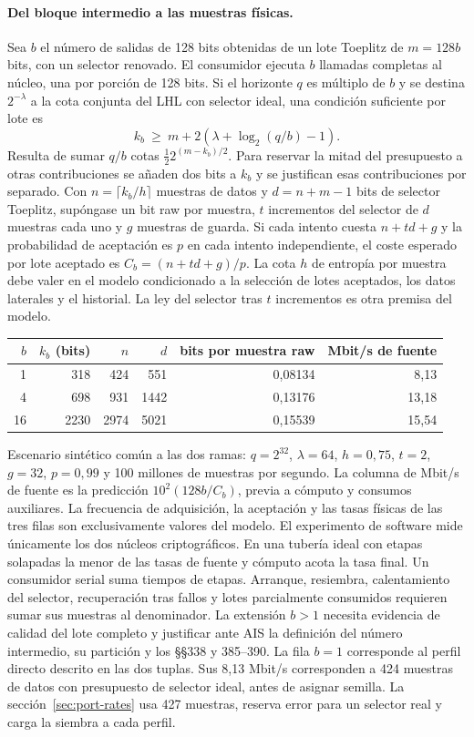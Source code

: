 \paragraph{Del bloque intermedio a las muestras físicas.} Sea $b$ el número de salidas de
128 bits obtenidas de un lote Toeplitz de $m=128b$ bits, con un selector renovado. El consumidor
ejecuta $b$ llamadas completas al núcleo, una por porción de 128 bits. Si el horizonte $q$ es
múltiplo de $b$ y se destina $2^{-\lambda}$ a la cota conjunta del LHL con selector ideal,
una condición suficiente por lote es
\[
 k_b\ \ge\ m+2\left(\lambda+\log_2(q/b)-1\right).
\]
Resulta de sumar $q/b$ cotas $\tfrac12 2^{(m-k_b)/2}$. Para reservar la mitad del presupuesto
a otras contribuciones se añaden dos bits a $k_b$ y se justifican esas contribuciones por separado.
Con $n=\lceil k_b/h\rceil$ muestras de datos y $d=n+m-1$ bits de selector Toeplitz, supóngase un
bit raw por muestra, $t$ incrementos del selector de $d$ muestras cada uno y $g$ muestras de
guarda. Si cada intento cuesta $n+td+g$ y la probabilidad de aceptación es $p$ en cada intento
independiente, el coste esperado por lote aceptado es $C_b=(n+td+g)/p$. La cota $h$ de entropía
por muestra debe valer en el modelo condicionado a la selección de lotes aceptados, los datos
laterales y el historial. La ley del selector tras $t$ incrementos es otra premisa del modelo.

\begin{center}\small
\begin{tabular}{@{}rrrrrr@{}}\toprule
$b$ & $k_b$ (bits) & $n$ & $d$ & bits por muestra raw & Mbit/s de fuente\\\midrule
1 &318&424&551&0,08134&8,13\\
4 &698&931&1442&0,13176&13,18\\
16&2230&2974&5021&0,15539&15,54\\\bottomrule
\end{tabular}\end{center}
Escenario sintético común a las dos ramas: $q=2^{32}$, $\lambda=64$, $h=0{,}75$, $t=2$,
$g=32$, $p=0{,}99$ y 100 millones de muestras por segundo. La columna de Mbit/s de fuente es la predicción
$10^2(128b/C_b)$, previa a cómputo y consumos auxiliares. La frecuencia de adquisición, la
aceptación y las tasas físicas de las tres filas son exclusivamente valores del modelo.
El experimento de software mide únicamente los dos núcleos criptográficos. En una tubería ideal con etapas
solapadas la menor de las tasas de fuente y cómputo acota la tasa final. Un consumidor serial
suma tiempos de etapas. Arranque, resiembra, calentamiento del selector, recuperación tras
fallos y lotes parcialmente consumidos requieren sumar sus muestras al denominador.
La extensión $b>1$ necesita evidencia de calidad del lote completo y justificar ante AIS la
definición del número intermedio, su partición y los §§338 y 385--390. La fila $b=1$ corresponde
al perfil directo descrito en las dos tuplas. Sus 8,13 Mbit/s corresponden a
424 muestras de datos con presupuesto de selector ideal, antes de asignar semilla.
La sección~\ref{sec:port-rates} usa 427 muestras, reserva error para un selector
real y carga la siembra a cada perfil.

